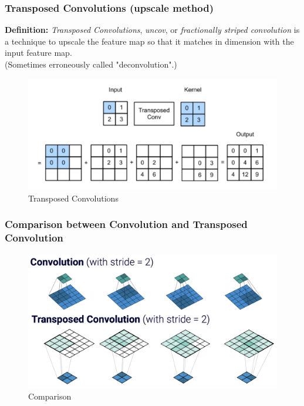 \documentclass[11pt,a4paper]{article}
\begin{document}
\subsubsection{Transposed Convolutions (upscale method)}
\textbf{Definition:} \textit{Transposed Convolutions}, \textit{uncov}, or \textit{fractionally striped convolution} is a technique to upscale the feature map so that it matches in dimension with the input feature map.\\
(Sometimes erroneously called "deconvolution".)
\begin{center}\begin{figure}[htbp]
    \centering
    \includegraphics[scale=0.2]{Transposed Convolutions.png}
    \caption{Transposed Convolutions}
    \label{}
\end{figure}\end{center}
\subsubsection*{Comparison between Convolution and Transposed Convolution}
\begin{center}\begin{figure}[htbp]
    \centering
    \includegraphics[scale=0.2]{Comparison_conv.png}
    \caption{Comparison}
    \label{}
\end{figure}\end{center}
\end{document}
